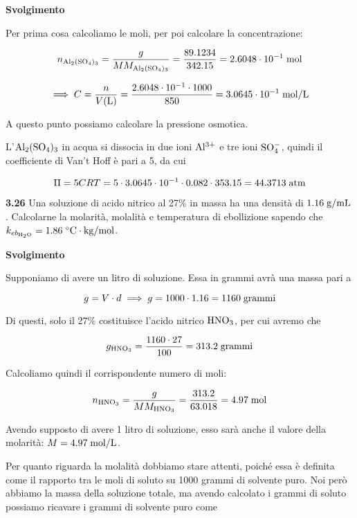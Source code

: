 \vspace{0.2cm}\large\textbf{Svolgimento}\normalsize

\vspace{0.2cm}Per prima cosa calcoliamo le moli, per poi calcolare la concentrazione:

$$n_{\rm Al_2(SO_4)_3}=\frac{g}{MM_{\rm Al_2(SO_4)_3}}=\frac{89.1234}{342.15}=2.6048 \cdot 10^{-1} \; \rm mol$$

$$\implies C
=\frac{n}{V(\text{L})}
=\frac{2.6048 \cdot 10^{-1} \cdot 1000}{850}
=3.0645 \cdot 10^{-1} \; \rm mol/L$$

A questo punto possiamo calcolare la pressione osmotica.

L'$\rm Al_2(SO_4)_3$ in acqua si dissocia in due ioni $\rm Al^{3+}$ e tre ioni $\rm SO_4^-$, quindi il coefficiente di Van't Hoff è pari a 5, da cui

$$\Pi=5CRT
=5 \cdot 3.0645 \cdot 10^{-1} \cdot 0.082 \cdot 353.15
=44.3713 \; \rm atm$$

\vspace{0.2cm}\textbf{3.26} Una soluzione di acido nitrico al 27\% in massa ha una densità di $1.16 \; \rm g/mL$. Calcolarne la molarità, molalità e temperatura di ebollizione sapendo che $k_{eb_{\rm H_2O}}=1.86 \; \rm ^{\circ}C \cdot kg/mol$.

\vspace{0.2cm}\large\textbf{Svolgimento}\normalsize

\vspace{0.2cm}Supponiamo di avere un litro di soluzione. Essa in grammi avrà una massa pari a

$$g=V \cdot d \implies g=1000 \cdot 1.16 = 1160 \; \rm grammi$$

Di questi, solo il 27\% costituisce l'acido nitrico $\rm HNO_3$, per cui avremo che

$$g_{\rm HNO_3}=\frac{1160 \cdot 27}{100}=313.2 \; \rm grammi$$

Calcoliamo quindi il corrispondente numero di moli:

$$n_{\rm HNO_3}=\frac{g}{MM_{\rm HNO_3}}
=\frac{313.2}{63.018}=4.97 \; \rm mol$$

Avendo supposto di avere 1 litro di soluzione, esso sarà anche il valore della molarità: $M=4.97 \; \rm mol/L$.

\vspace{0.2cm}Per quanto riguarda la molalità dobbiamo stare attenti, poiché essa è definita come il rapporto tra le moli di soluto su 1000 grammi di solvente puro. Noi però abbiamo la massa della soluzione totale, ma avendo calcolato i grammi di soluto possiamo ricavare i grammi di solvente puro come

